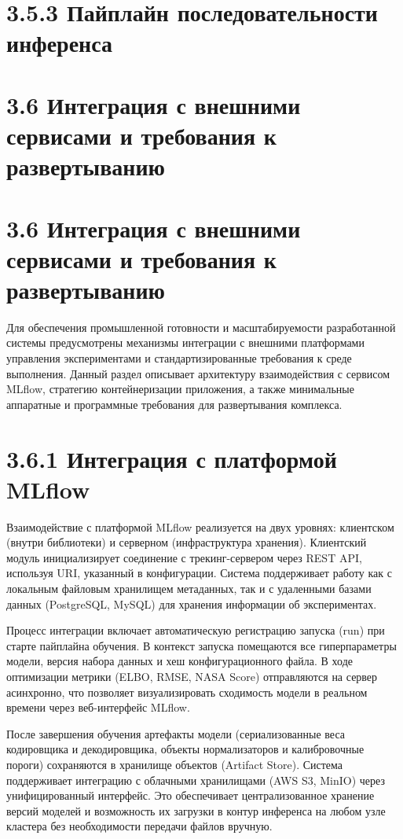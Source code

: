 \documentclass[14pt, a4paper, oneside]{extreport}
\begin{document}
\vspace{1em}
\section{3.5.3 Пайплайн последовательности инференса}
\vspace{1em}


\vspace{1em}
\section{3.6 Интеграция с внешними сервисами и требования к развертыванию}
\vspace{1em}
\section{3.6 Интеграция с внешними сервисами и требования к развертыванию}

Для обеспечения промышленной готовности и масштабируемости разработанной системы предусмотрены механизмы интеграции с внешними платформами управления экспериментами и стандартизированные требования к среде выполнения. Данный раздел описывает архитектуру взаимодействия с сервисом MLflow, стратегию контейнеризации приложения, а также минимальные аппаратные и программные требования для развертывания комплекса.

\section{3.6.1 Интеграция с платформой MLflow}

Взаимодействие с платформой MLflow реализуется на двух уровнях: клиентском (внутри библиотеки) и серверном (инфраструктура хранения). Клиентский модуль инициализирует соединение с трекинг-сервером через REST API, используя URI, указанный в конфигурации. Система поддерживает работу как с локальным файловым хранилищем метаданных, так и с удаленными базами данных (PostgreSQL, MySQL) для хранения информации об экспериментах.

Процесс интеграции включает автоматическую регистрацию запуска (run) при старте пайплайна обучения. В контекст запуска помещаются все гиперпараметры модели, версия набора данных и хеш конфигурационного файла. В ходе оптимизации метрики (ELBO, RMSE, NASA Score) отправляются на сервер асинхронно, что позволяет визуализировать сходимость модели в реальном времени через веб-интерфейс MLflow.

После завершения обучения артефакты модели (сериализованные веса кодировщика и декодировщика, объекты нормализаторов и калибровочные пороги) сохраняются в хранилище объектов (Artifact Store). Система поддерживает интеграцию с облачными хранилищами (AWS S3, MinIO) через унифицированный интерфейс. Это обеспечивает централизованное хранение версий моделей и возможность их загрузки в контур инференса на любом узле кластера без необходимости передачи файлов вручную.
\end{document}
